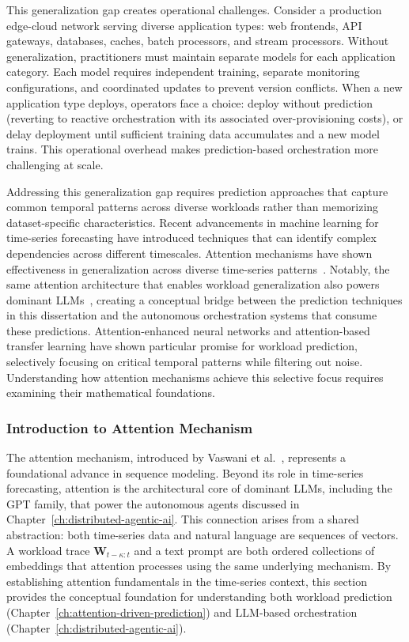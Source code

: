 This generalization gap creates operational challenges. Consider a production edge-cloud network serving diverse application types: web frontends, \ac{API} gateways, databases, caches, batch processors, and stream processors. Without generalization, practitioners must maintain separate models for each application category. Each model requires independent training, separate monitoring configurations, and coordinated updates to prevent version conflicts. When a new application type deploys, operators face a choice: deploy without prediction (reverting to reactive orchestration with its associated over-provisioning costs), or delay deployment until sufficient training data accumulates and a new model trains. This operational overhead makes prediction-based orchestration more challenging at scale.

Addressing this generalization gap requires prediction approaches that capture common temporal patterns across diverse workloads rather than memorizing dataset-specific characteristics. Recent advancements in machine learning for time-series forecasting have introduced techniques that can identify complex dependencies across different timescales. Attention mechanisms have shown effectiveness in generalization across diverse time-series patterns~\cite{vaswani2017attention, wen2022transformers}. Notably, the same attention architecture that enables workload generalization also powers dominant \acp{LLM}~\cite{vaswani2017attention}, creating a conceptual bridge between the prediction techniques in this dissertation and the autonomous orchestration systems that consume these predictions. Attention-enhanced neural networks and attention-based transfer learning have shown particular promise for workload prediction, selectively focusing on critical temporal patterns while filtering out noise. Understanding how attention mechanisms achieve this selective focus requires examining their mathematical foundations.

\subsubsection{Introduction to Attention Mechanism}
\label{subsec:ch2_attention_mechanism}

The attention mechanism, introduced by Vaswani et al.~\cite{vaswani2017attention}, represents a foundational advance in sequence modeling. Beyond its role in time-series forecasting, attention is the architectural core of dominant \acp{LLM}, including the GPT family, that power the autonomous agents discussed in Chapter~\ref{ch:distributed-agentic-ai}. This connection arises from a shared abstraction: both time-series data and natural language are sequences of vectors. A workload trace $\mathbf{W}_{t-\kappa:t}$ and a text prompt are both ordered collections of embeddings that attention processes using the same underlying mechanism. By establishing attention fundamentals in the time-series context, this section provides the conceptual foundation for understanding both workload prediction (Chapter~\ref{ch:attention-driven-prediction}) and \ac{LLM}-based orchestration (Chapter~\ref{ch:distributed-agentic-ai}).

